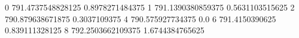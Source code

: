 0 791.4737548828125 0.8978271484375
1 791.1390380859375 0.5631103515625
2 790.879638671875 0.3037109375
4 790.575927734375 0.0
6 791.4150390625 0.839111328125
8 792.2503662109375 1.6744384765625
